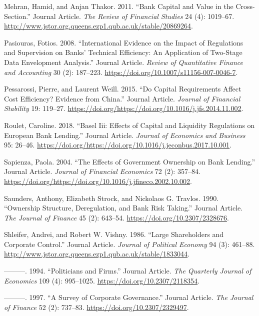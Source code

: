 \documentclass{article}
\begin{document}
\leavevmode\hypertarget{ref-RN64}{}%
Mehran, Hamid, and Anjan Thakor. 2011. ``Bank Capital and Value in the
Cross-Section.'' Journal Article. \emph{The Review of Financial Studies}
24 (4): 1019--67.
\url{http://www.jstor.org.queens.ezp1.qub.ac.uk/stable/20869264}.

\leavevmode\hypertarget{ref-RN65}{}%
Pasiouras, Fotios. 2008. ``International Evidence on the Impact of
Regulations and Supervision on Banks' Technical Efficiency: An
Application of Two-Stage Data Envelopment Analysis.'' Journal Article.
\emph{Review of Quantitative Finance and Accounting} 30 (2): 187--223.
\url{https://doi.org/10.1007/s11156-007-0046-7}.

\leavevmode\hypertarget{ref-RN66}{}%
Pessarossi, Pierre, and Laurent Weill. 2015. ``Do Capital Requirements
Affect Cost Efficiency? Evidence from China.'' Journal Article.
\emph{Journal of Financial Stability} 19: 119--27.
\url{https://doi.org/https://doi.org/10.1016/j.jfs.2014.11.002}.

\leavevmode\hypertarget{ref-RN68}{}%
Roulet, Caroline. 2018. ``Basel Iii: Effects of Capital and Liquidity
Regulations on European Bank Lending.'' Journal Article. \emph{Journal
of Economics and Business} 95: 26--46.
\url{https://doi.org/https://doi.org/10.1016/j.jeconbus.2017.10.001}.

\leavevmode\hypertarget{ref-RN69}{}%
Sapienza, Paola. 2004. ``The Effects of Government Ownership on Bank
Lending.'' Journal Article. \emph{Journal of Financial Economics} 72
(2): 357--84.
\url{https://doi.org/https://doi.org/10.1016/j.jfineco.2002.10.002}.

\leavevmode\hypertarget{ref-RN70}{}%
Saunders, Anthony, Elizabeth Strock, and Nickolaos G. Travlos. 1990.
``Ownership Structure, Deregulation, and Bank Risk Taking.'' Journal
Article. \emph{The Journal of Finance} 45 (2): 643--54.
\url{https://doi.org/10.2307/2328676}.

\leavevmode\hypertarget{ref-RN71}{}%
Shleifer, Andrei, and Robert W. Vishny. 1986. ``Large Shareholders and
Corporate Control.'' Journal Article. \emph{Journal of Political
Economy} 94 (3): 461--88.
\url{http://www.jstor.org.queens.ezp1.qub.ac.uk/stable/1833044}.

\leavevmode\hypertarget{ref-RN72}{}%
---------. 1994. ``Politicians and Firms.'' Journal Article. \emph{The
Quarterly Journal of Economics} 109 (4): 995--1025.
\url{https://doi.org/10.2307/2118354}.

\leavevmode\hypertarget{ref-RN4}{}%
---------. 1997. ``A Survey of Corporate Governance.'' Journal Article.
\emph{The Journal of Finance} 52 (2): 737--83.
\url{https://doi.org/10.2307/2329497}.
\end{document}
